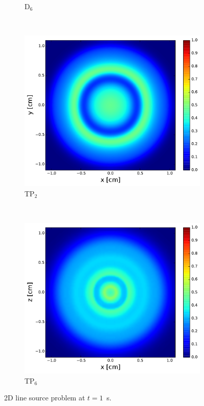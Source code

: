 \documentclass[review]{elsarticle}
\begin{document}
\begin{figure}[ht!]
\begin{subfigure}{.5\textwidth}
		\caption{D$_6$}
		\label{f:d6}
	\end{subfigure}
	~
	\begin{subfigure}{.5\textwidth}
		\centering
		\hspace*{-1cm}\includegraphics[width=1.\linewidth]{tp2.pdf}
		\caption{TP$_2$}
		\label{f:tp2}
	\end{subfigure}
	~
	\begin{subfigure}{.5\textwidth}
		\centering
		\includegraphics[width=1.\linewidth]{tp-6.pdf}
		\caption{TP$_6$}
		\label{f:tp6}
	\end{subfigure}
	\caption{2D line source problem at $t=1$\ s.}
	\label{f:line}
\end{figure}
\end{document}
